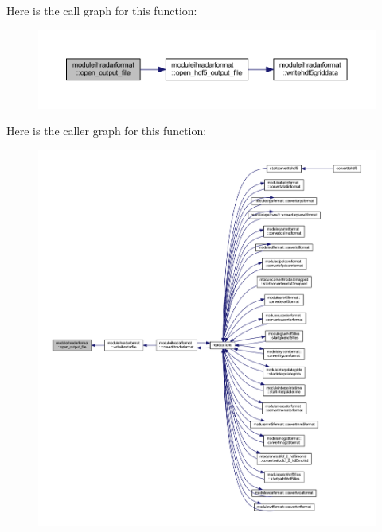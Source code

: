 Here is the call graph for this function\+:\nopagebreak
\begin{figure}[H]
\begin{center}
\leavevmode
\includegraphics[width=350pt]{namespacemoduleihradarformat_a1fa82a4000e864d7a0c4a4e1759efac9_cgraph}
\end{center}
\end{figure}
Here is the caller graph for this function\+:\nopagebreak
\begin{figure}[H]
\begin{center}
\leavevmode
\includegraphics[width=350pt]{namespacemoduleihradarformat_a1fa82a4000e864d7a0c4a4e1759efac9_icgraph}
\end{center}
\end{figure}
\mbox{\label{namespacemoduleihradarformat_a1ddc10c28e0f93952a3e8c21ab4b9e37}} 
